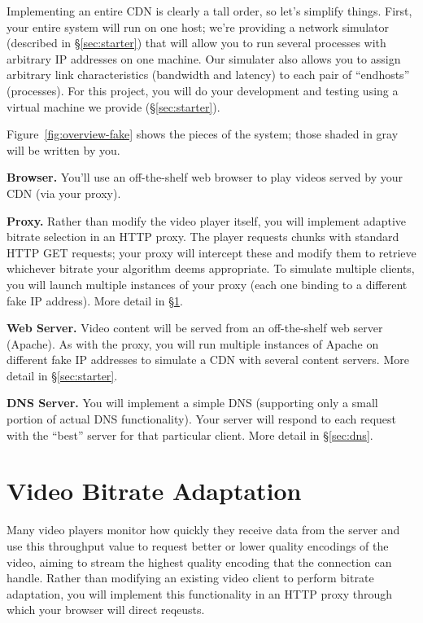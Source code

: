 \documentclass{article}
\begin{document}
Implementing an entire CDN is clearly a tall order, so let's simplify things.
First, your entire system will run on one host; we're providing a network
simulator (described in \S\ref{sec:starter}) that will allow you to run several
processes with arbitrary IP addresses on one machine. Our simulater also allows
you to assign arbitrary link characteristics (bandwidth and latency) to each
pair of ``endhosts'' (processes). For this project, you will do your
development and testing using a virtual machine we provide
(\S\ref{sec:starter}).

Figure~\ref{fig:overview-fake} shows the pieces of the system; those shaded in
gray will be written by you.

\medskip\noindent \textbf{Browser.} You'll use an off-the-shelf web browser to play
videos served by your CDN (via your proxy).

\medskip \noindent \textbf{Proxy.} Rather than modify the video player itself, you will
implement adaptive bitrate selection in an HTTP proxy. The player requests
chunks with standard HTTP GET requests; your proxy will intercept these and
modify them to retrieve whichever bitrate your algorithm deems appropriate. To
simulate multiple clients, you will launch multiple instances of your proxy
(each one binding to a different fake IP address). More detail in
\S\ref{sec:proxy}.

\medskip \noindent \textbf{Web Server.} Video content will be served from an
off-the-shelf web server (Apache). As with the proxy, you will run multiple
instances of Apache on different fake IP addresses to simulate a CDN with
several content servers. More detail in \S\ref{sec:starter}.

\medskip \noindent \textbf{DNS Server.} You will implement a simple DNS (supporting only
a small portion of actual DNS functionality). Your server will respond to each
request with the ``best'' server for that particular client. More detail in
\S\ref{sec:dns}.




\section{Video Bitrate Adaptation}
\label{sec:proxy}

Many video players monitor how quickly they receive data from the server and
use this throughput value to request better or lower quality encodings of the
video, aiming to stream the highest quality encoding that the connection can
handle. Rather than modifying an existing video client to perform bitrate
adaptation, you will implement this functionality in an HTTP proxy through
which your browser will direct reqeusts.
\end{document}
